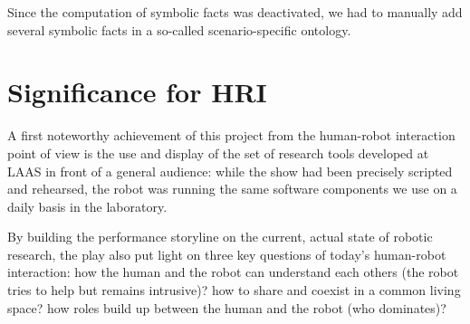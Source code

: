 Since the computation of symbolic facts was deactivated, we had to manually add
several symbolic facts in a so-called scenario-specific ontology.

\section{Significance for HRI}

A first noteworthy achievement of this project from the human-robot
interaction point of view is the use and display of the set of research tools
developed at LAAS in front of a general audience: while the show had been
precisely scripted and rehearsed, the robot was running the same software
components we use on a daily basis in the laboratory.

By building the performance storyline on the current, actual state of robotic
research,  the play also put light on three key questions of today's
human-robot interaction: how the human and the robot can understand each others
(the robot tries to help but remains intrusive)? how to share and coexist in a
common living space? how roles build up between the human and the robot (who
dominates)?

